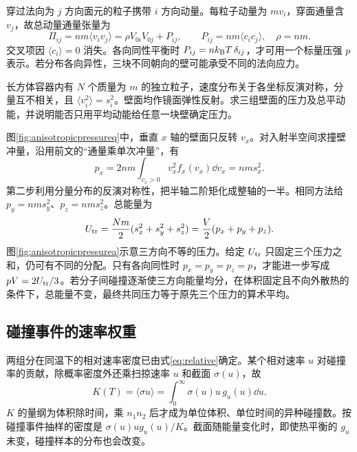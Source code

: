 穿过法向为 $j$ 方向面元的粒子携带 $i$ 方向动量。每粒子动量为 $mv_i$，穿面通量含 $v_j$，故总动量通量张量为
\[
 \Pi_{ij}=nm\langle v_iv_j\rangle
 =\rho V_{0i}V_{0j}+P_{ij},\qquad
 P_{ij}=nm\langle c_ic_j\rangle,\quad \rho=nm.
\]
交叉项因 $\langle c_i\rangle=0$ 消失。各向同性平衡时 $P_{ij}=nk_{\mathrm B} T\,\delta_{ij}$，才可用一个标量压强 $p$ 表示。若分布各向异性，三块不同朝向的壁可能承受不同的法向应力。

\begin{example}[各向异性粒子群的壁面压力]
\label{ex:anisotropicpressure}
长方体容器内有 $N$ 个质量为 $m$ 的独立粒子，速度分布关于各坐标反演对称，分量互不相关，且 $\langle v_i^2\rangle=s_i^2$。壁面均作镜面弹性反射。求三组壁面的压力及总平动能，并说明能否只用平均动能给任意一块壁确定压力。
\end{example}
\begin{solution}
图\ref{fig:anisotropicpressureq}中，垂直 $x$ 轴的壁面只反转 $v_x$。对入射半空间求撞壁冲量，沿用前文的“通量乘单次冲量”，有
\[
 p_x=2nm\int_{v_x>0}v_x^2f_x(v_x)\dd v_x
 =nm s_x^2.
\]
第二步利用分量分布的反演对称性，把半轴二阶矩化成整轴的一半。相同方法给 $p_y=nm s_y^2$、$p_z=nm s_z^2$。总能量为
\[
 U_{\rm tr}=\frac{Nm}{2}(s_x^2+s_y^2+s_z^2)
 =\frac V2(p_x+p_y+p_z).
\]
图\ref{fig:anisotropicpressurea}示意三方向不等的压力。给定 $U_{\rm tr}$ 只固定三个压力之和，仍可有不同的分配。只有各向同性时 $p_x=p_y=p_z=p$，才能进一步写成 $pV=2U_{\rm tr}/3$。若分子间碰撞逐渐使三方向能量均分，在体积固定且不向外散热的条件下，总能量不变，最终共同压力等于原先三个压力的算术平均。
\end{solution}

\subsection{碰撞事件的速率权重}
两组分在同温下的相对速率密度已由式\eqref{eq:relative}确定。某个相对速率 $u$ 对碰撞率的贡献，除概率密度外还乘扫掠速率 $u$ 和截面 $\sigma(u)$，故
\[
 K(T)=\langle\sigma u\rangle
 =\int_0^\infty\sigma(u)u\,g_u(u)\dd u.
\]
$K$ 的量纲为体积除时间，乘 $n_1n_2$ 后才成为单位体积、单位时间的异种碰撞数。按碰撞事件抽样的密度是 $\sigma(u)u g_u(u)/K$。截面随能量变化时，即使热平衡的 $g_u$ 未变，碰撞样本的分布也会改变。

